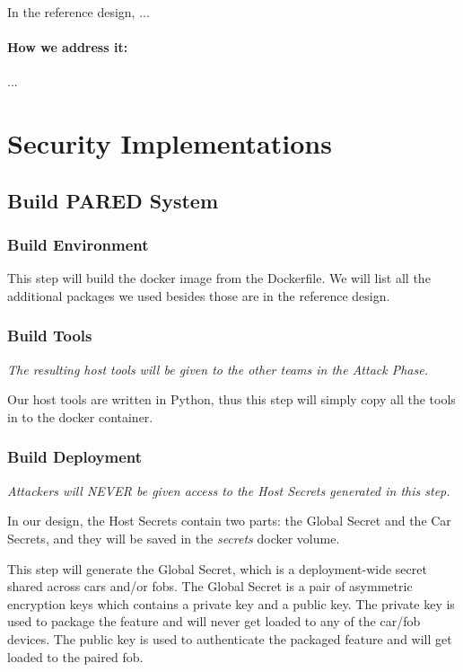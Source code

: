 \documentclass[11pt,oneside,onecolumn,letterpaper]{article}
\begin{document}
In the reference design, ...

\paragraph{How we address it:} ...



\section{Security Implementations}



\subsection{Build PARED System}

\subsubsection{Build Environment}

This step will build the docker image from the Dockerfile. We will list all the additional packages we used besides those are in the reference design.

\subsubsection{Build Tools}

\textit{The resulting host tools will be given to the other teams in the Attack Phase.}

Our host tools are written in Python, thus this step will simply copy all the tools in to the docker container.

\subsubsection{Build Deployment}

\textit{Attackers will NEVER be given access to the Host Secrets generated in this step.}

In our design, the Host Secrets contain two parts: the Global Secret and the Car Secrets, and they will be saved in the \textit{secrets} docker volume.

This step will generate the Global Secret, which is a deployment-wide secret shared across cars and/or fobs.
The Global Secret is a pair of asymmetric encryption keys which contains a private key and a public key.
The private key is used to package the feature and will never get loaded to any of the car/fob devices.
The public key is used to authenticate the packaged feature and will get loaded to the paired fob.
\end{document}
